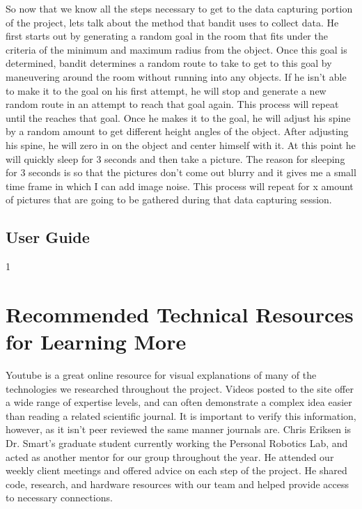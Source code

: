\documentclass[draftclsnofoot, onecolumn, 10pt, compsoc]{IEEEtran}
\begin{document}
So now that we know all the steps necessary to get to the data capturing portion of the project, lets talk about the method that bandit uses to collect data. He first starts out by generating a random goal in the room that fits under the criteria of the minimum and maximum radius from the object. Once this goal is determined, bandit determines a random route to take to get to this goal by maneuvering around the room without running into any objects. If he isn’t able to make it to the goal on his first attempt, he will stop and generate a new random route in an attempt to reach that goal again. This process will repeat until the reaches that goal. Once he makes it to the goal, he will adjust his spine by a random amount to get different height angles of the object. After adjusting his spine, he will zero in on the object and center himself with it. At this point he will quickly sleep for 3 seconds and then take a picture. The reason for sleeping for 3 seconds is so that the pictures don’t come out blurry and it gives me a small time frame in which I can add image noise. This process will repeat for x amount of pictures that are going to be gathered during that data capturing session. 
	
    \newpage
	\subsection{User Guide}
    	1   \newpage
    


\section{Recommended Technical Resources for Learning More}
  Youtube is a great online resource for visual explanations of many of the technologies we researched throughout the project. Videos posted to the site offer a wide range of expertise levels, and can often demonstrate a complex idea easier than reading a related scientific journal. It is important to verify this information, however, as it isn't peer reviewed the same manner journals are.   
  Chris Eriksen is Dr. Smart's graduate student currently working the Personal Robotics Lab, and acted as another mentor for our group throughout the year. He attended our weekly client meetings and offered advice on each step of the project. He shared code, research, and hardware resources with our team and helped provide access to necessary connections. 
\end{document}
